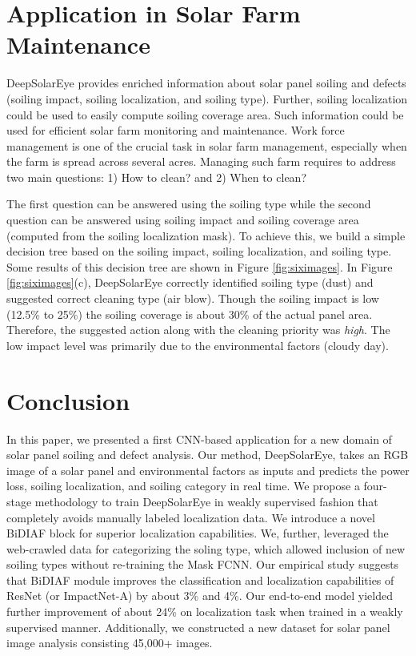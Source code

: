 \documentclass[10pt,twocolumn,letterpaper]{article}
\begin{document}
\section{Application in Solar Farm Maintenance}
\vspace{-2mm}
DeepSolarEye provides enriched information about solar panel soiling and defects (soiling impact, soiling localization, and soiling type). Further, soiling localization could be used to easily compute soiling coverage area. Such information could be used for efficient solar farm monitoring and maintenance. Work force management is one of the crucial task in solar farm management, especially when the farm is spread across several acres. Managing such farm requires to address two main questions: 1) How to clean? and 2) When to clean?

The first question can be answered using the soiling type while the second question can be answered using soiling impact and soiling coverage area (computed from the soiling localization mask). To achieve this, we build a simple decision tree based on the soiling impact, soiling localization, and soiling type. Some results of this decision tree are shown in Figure \ref{fig:siximages}. In Figure \ref{fig:siximages}(c), DeepSolarEye correctly identified soiling type (dust) and suggested correct cleaning type (air blow). Though the soiling impact is low (12.5\% to 25\%) the soiling coverage is about 30\% of the actual panel area. Therefore, the suggested action along with the cleaning priority was \textit{high}. The low impact level was primarily due to the environmental factors (cloudy day). %

\vspace{-2mm}
\section{Conclusion}
\vspace{-2mm}
In this paper, we presented a first CNN-based application for a new domain of solar panel soiling and defect analysis.  Our method, DeepSolarEye, takes an RGB image of a solar panel and environmental factors as inputs and predicts the power loss, soiling localization, and soiling category in real time. We propose a four-stage methodology to train DeepSolarEye in weakly supervised fashion that completely avoids manually labeled localization data. We introduce a novel BiDIAF block for superior localization capabilities. We, further, leveraged the web-crawled data for categorizing the soling type, which allowed inclusion of new soiling types without re-training the Mask FCNN. Our empirical study suggests that BiDIAF module improves the classification and localization capabilities of ResNet (or ImpactNet-A) by about 3\% and 4\%. Our end-to-end model yielded further improvement of about 24\% on localization task when trained in a weakly supervised manner.  Additionally, we constructed a new dataset for solar panel image analysis consisting 45,000+ images. 
\end{document}
